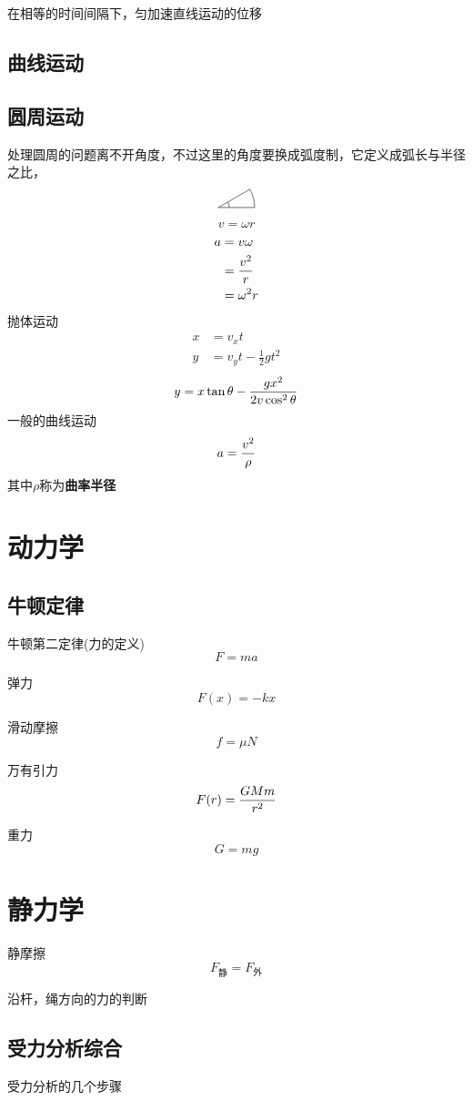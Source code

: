 \documentclass[hyperref,UTF8]{ctexart}
\begin{document}
在相等的时间间隔下，匀加速直线运动的位移
\subsection{曲线运动}
\subsection{圆周运动}
处理圆周的问题离不开角度，不过这里的角度要换成弧度制，它定义成弧长与半径之比，
\[
\begin{tikzpicture}
    \draw (0,0)--(0:1);
    \draw (0:1) arc [start angle=0, end angle=30, radius=1cm];
    \draw (3mm,0mm) arc [start angle=0, end angle=30, radius=3mm];
    
    \draw (0,0)--(30:1);
\end{tikzpicture}
\]
\[v = \omega r\]
\begin{align*}
    a &= v\omega\\
    & = {v^2 \over r}\\
    & = \omega^2 r
\end{align*}
抛体运动
\begin{align*}
    x &=v_x t \\
    y &=v_y t - \frac12 gt^2  
\end{align*}
\[y = x \tan\theta -{gx^2 \over 2v\cos^2{\theta}}\]
一般的曲线运动
\[a = {v^2\over \rho }\]
其中$\rho$称为\textbf{曲率半径}
\section{动力学}
\subsection{牛顿定律}
牛顿第二定律(力的定义)
\[F = ma\]

弹力
\[F(x) = -kx\]

滑动摩擦
\[f=\mu N\]

万有引力
\[F(r) = {GMm \over r^2}\]

重力
\[G = mg\]

\section{静力学}
静摩擦
\[F_{\text{静}}=F_{\text{外}}\]

沿杆，绳方向的力的判断
\subsection*{受力分析综合}
受力分析的几个步骤
\end{document}
